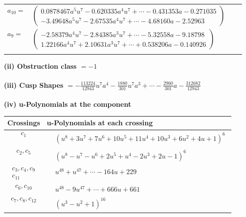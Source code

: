 \documentclass[1p]{elsarticle_modified}
\theoremstyle{definition}
\begin{document}
\begin{tabular}{m{7pt} m{180pt} m{7pt} m{180pt} }
\flushright $a_{10}=$&$\begin{pmatrix}0.0878467 a^{5} u^{7}-0.620335 a^{4} u^{7}+\cdots-0.431353 a-0.271035\\-3.49648 a^{5} u^{7}-2.67535 a^{4} u^{7}+\cdots-4.68160 a-2.52963\end{pmatrix}$ \\
\flushright $a_{9}=$&$\begin{pmatrix}-2.58379 a^{4} u^{7}-2.84385 a^{3} u^{7}+\cdots-5.32558 a-9.18798\\1.22166 a^{4} u^{7}+2.10631 a^{3} u^{7}+\cdots+0.538206 a-0.140926\end{pmatrix}$\\&\end{tabular}
\flushleft \textbf{(ii) Obstruction class $= -1$}\\~\\
\flushleft \textbf{(iii) Cusp Shapes $= -\frac{113224}{12943} u^7 a^4-\frac{1880}{301} u^7 a^3+\cdots-\frac{2960}{301} a-\frac{312682}{12943}$}\\~\\
\newpage\renewcommand{\arraystretch}{1}
\flushleft \textbf{(iv) u-Polynomials at the component}\newline \\
\begin{tabular}{m{50pt}|m{274pt}}
Crossings & \hspace{64pt}u-Polynomials at each crossing \\
\hline $$\begin{aligned}c_{1}\end{aligned}$$&$\begin{aligned}
&(u^8+3 u^7+7 u^6+10 u^5+11 u^4+10 u^3+6 u^2+4 u+1)^6
\end{aligned}$\\
\hline $$\begin{aligned}c_{2},c_{5}\end{aligned}$$&$\begin{aligned}
&(u^8- u^7- u^6+2 u^5+u^4-2 u^3+2 u-1)^6
\end{aligned}$\\
\hline $$\begin{aligned}c_{3},c_{4},c_{9}\\c_{11}\end{aligned}$$&$\begin{aligned}
&u^{48}+u^{47}+\cdots-164 u+229
\end{aligned}$\\
\hline $$\begin{aligned}c_{6},c_{10}\end{aligned}$$&$\begin{aligned}
&u^{48}-9 u^{47}+\cdots+666 u+661
\end{aligned}$\\
\hline $$\begin{aligned}c_{7},c_{8},c_{12}\end{aligned}$$&$\begin{aligned}
&(u^3- u^2+1)^{16}
\end{aligned}$\\
\hline
\end{tabular}\\~\\
\end{document}
